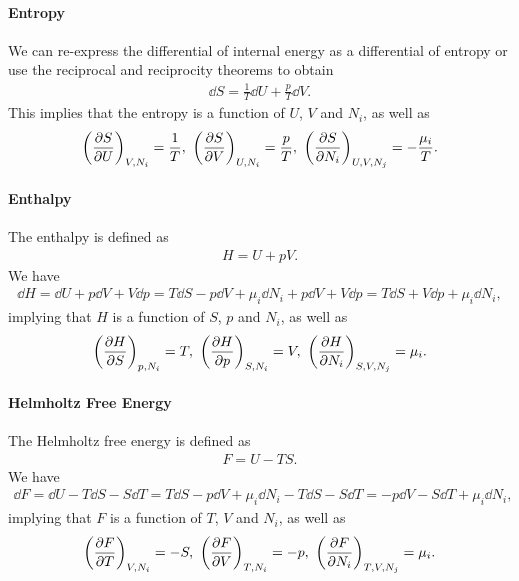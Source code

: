 \paragraph{Entropy}
We can re-express the differential of internal energy as a differential of entropy or use the reciprocal and reciprocity theorems to obtain
\begin{align*}
	\dd{S} = \frac{1}{T}\dd{U} + \frac{p}{T}\dd{V}.
\end{align*}
This implies that the entropy is a function of $U$, $V$ and $N_{i}$, as well as
\begin{align*}
	\left(\pdv{S}{U}\right)_{V, N_{i}} = \frac{1}{T},\ \left(\pdv{S}{V}\right)_{U, N_{i}} = \frac{p}{T},\ \left(\pdv{S}{N_{i}}\right)_{U, V, N_{j}} = -\frac{\mu_{i}}{T}.
\end{align*}

\paragraph{Enthalpy}
The enthalpy is defined as 
\begin{align*}
	H = U + pV.
\end{align*}
We have
\begin{align*}
	\dd{H} = \dd{U} + p\dd{V} + V\dd{p} = T\dd{S} - p\dd{V} + \mu_{i}\dd{N_{i}} + p\dd{V} + V\dd{p} = T\dd{S} + V\dd{p} + \mu_{i}\dd{N_{i}},
\end{align*}
implying that $H$ is a function of $S$, $p$ and $N_{i}$, as well as
\begin{align*}
	\fix{\pdv{H}{S}}{p, N_{i}} = T,\ \fix{\pdv{H}{p}}{S, N_{i}} = V,\ \fix{\pdv{H}{N_{i}}}{S, V,  N_{j}} = \mu_{i}.
\end{align*}

\paragraph{Helmholtz Free Energy}
The Helmholtz free energy is defined as
\begin{align*}
	F = U - TS.
\end{align*}
We have
\begin{align*}
	\dd{F} = \dd{U} - T\dd{S} - S\dd{T} = T\dd{S} - p\dd{V} + \mu_{i}\dd{N_{i}} - T\dd{S} - S\dd{T} = -p\dd{V} - S\dd{T} + \mu_{i}\dd{N_{i}},
\end{align*}
implying that $F$ is a function of $T$, $V$ and $N_{i}$, as well as
\begin{align*}
	\fix{\pdv{F}{T}}{V, N_{i}} = -S,\ \fix{\pdv{F}{V}}{T, N_{i}} = -p,\ \fix{\pdv{F}{N_{i}}}{T, V,  N_{j}} = \mu_{i}.
\end{align*}

